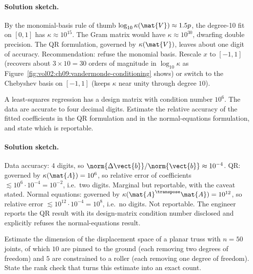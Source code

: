 \paragraph{Solution sketch.}
By the monomial-basis rule of thumb $\log_{10}\kappa(\mat{V})
\approx 1.5 p$, the degree-10 fit on $[0, 1]$ has $\kappa
\approx 10^{15}$. The Gram matrix would have $\kappa \approx
10^{30}$, dwarfing double precision. The QR formulation, governed
by $\kappa(\mat{V})$, leaves about one digit of accuracy.
Recommendation: refuse the monomial basis. Rescale $x$ to $[-1,
1]$ (recovers about $3 \times 10 = 30$ orders of magnitude in
$\log_{10}\kappa$ as Figure~\ref{fig:vol02:ch09:vandermonde-conditioning}
shows) or switch to the Chebyshev basis on $[-1, 1]$ (keeps
$\kappa$ near unity through degree $10$).

\begin{exercise}
A least-squares regression has a design matrix with condition
number $10^{6}$. The data are accurate to four decimal digits.
Estimate the relative accuracy of the fitted coefficients in the
QR formulation and in the normal-equations formulation, and state
which is reportable.
\end{exercise}

\paragraph{Solution sketch.}
Data accuracy: $4$ digits, so $\norm{\Delta\vect{b}}/\norm{\vect{b}}
\approx 10^{-4}$. QR: governed by $\kappa(\mat{A}) = 10^{6}$, so
relative error of coefficients $\lesssim 10^{6} \cdot 10^{-4} =
10^{-2}$, i.e.\ two digits. Marginal but reportable, with the
caveat stated. Normal equations: governed by $\kappa(\mat{A}^{\transpose}
\mat{A}) = 10^{12}$, so relative error $\lesssim 10^{12} \cdot
10^{-4} = 10^{8}$, i.e.\ no digits. Not reportable. The engineer
reports the QR result with its design-matrix condition number
disclosed and explicitly refuses the normal-equations result.

\begin{exercise}
Estimate the dimension of the displacement space of a planar truss
with $n = 50$ joints, of which $10$ are pinned to the ground (each
removing two degrees of freedom) and $5$ are constrained to a
roller (each removing one degree of freedom). State the rank check
that turns this estimate into an exact count.
\end{exercise}


